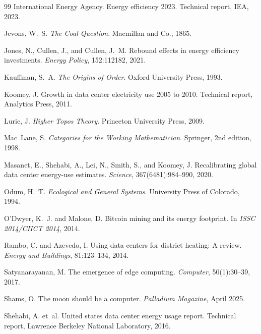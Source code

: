\documentclass[11pt,a4paper]{article}
\theoremstyle{plain}
\theoremstyle{definition}
\theoremstyle{remark}
\begin{document}
\begin{thebibliography}{99}
International Energy Agency.
\newblock Energy efficiency 2023.
\newblock Technical report, IEA, 2023.

Jevons, W.~S.
\newblock \emph{The Coal Question}.
\newblock Macmillan and Co., 1865.

Jones, N., Cullen, J., and Cullen, J.~M.
\newblock Rebound effects in energy efficiency investments.
\newblock \emph{Energy Policy}, 152:112182, 2021.

Kauffman, S.~A.
\newblock \emph{The Origins of Order}.
\newblock Oxford University Press, 1993.

Koomey, J.
\newblock Growth in data center electricity use 2005 to 2010.
\newblock Technical report, Analytics Press, 2011.

Lurie, J.
\newblock \emph{Higher Topos Theory}.
\newblock Princeton University Press, 2009.

Mac~Lane, S.
\newblock \emph{Categories for the Working Mathematician}.
\newblock Springer, 2nd edition, 1998.

Masanet, E., Shehabi, A., Lei, N., Smith, S., and Koomey, J.
\newblock Recalibrating global data center energy-use estimates.
\newblock \emph{Science}, 367(6481):984--990, 2020.

Odum, H.~T.
\newblock \emph{Ecological and General Systems}.
\newblock University Press of Colorado, 1994.

O'Dwyer, K.~J. and Malone, D.
\newblock Bitcoin mining and its energy footprint.
\newblock In \emph{ISSC 2014/CIICT 2014}, 2014.

Rambo, C. and Azevedo, I.
\newblock Using data centers for district heating: A review.
\newblock \emph{Energy and Buildings}, 81:123--134, 2014.

Satyanarayanan, M.
\newblock The emergence of edge computing.
\newblock \emph{Computer}, 50(1):30--39, 2017.

Shams, O.
\newblock The moon should be a computer.
\newblock \emph{Palladium Magazine}, April 2025.

Shehabi, A. et~al.
\newblock United states data center energy usage report.
\newblock Technical report, Lawrence Berkeley National Laboratory, 2016.


\end{thebibliography}
\end{document}
